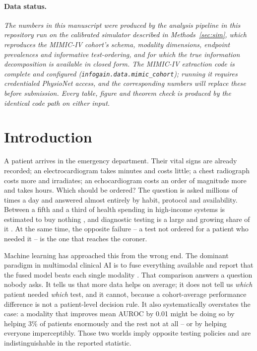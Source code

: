 \documentclass[11pt]{article}
\theoremstyle{definition}
\theoremstyle{remark}
\begin{document}
\paragraph{Data status.}
\emph{The numbers in this manuscript were produced by the analysis pipeline in
this repository run on the calibrated simulator described in
Methods~\ref{sec:sim}, which reproduces the MIMIC-IV cohort's schema, modality
dimensions, endpoint prevalences and informative test-ordering, and for which
the true information decomposition is available in closed form. The MIMIC-IV
extraction code is complete and configured
(\texttt{infogain.data.mimic\_cohort}); running it requires credentialed
PhysioNet access, and the corresponding numbers will replace these before
submission. Every table, figure and theorem check is produced by the identical
code path on either input.}

\section{Introduction}

A patient arrives in the emergency department. Their vital signs are already
recorded; an electrocardiogram takes minutes and costs little; a chest
radiograph costs more and irradiates; an echocardiogram costs an order of
magnitude more and takes hours. Which should be ordered? The question is asked
millions of times a day and answered almost entirely by habit, protocol and
availability. Between a fifth and a third of health spending in high-income
systems is estimated to buy nothing \citep{oecd2017tackling,brownlee2017overuse},
and diagnostic testing is a large and growing share of it
\citep{cassel2012choosing}. At the same time, the opposite failure -- a test not
ordered for a patient who needed it -- is the one that reaches the coroner.

Machine learning has approached this from the wrong end. The dominant paradigm
in multimodal clinical AI is to fuse everything available and report that the
fused model beats each single modality
\citep{huang2020fusion,soenksen2022holisticai,acosta2022multimodal}. That
comparison answers a question nobody asks. It tells us that more data helps on
average; it does not tell us \emph{which} patient needed \emph{which} test, and
it cannot, because a cohort-average performance difference is not a
patient-level decision rule. It also systematically overstates the case: a
modality that improves mean AUROC by 0.01 might be doing so by helping 3\% of
patients enormously and the rest not at all -- or by helping everyone
imperceptibly. Those two worlds imply opposite testing policies and are
indistinguishable in the reported statistic.
\end{document}
